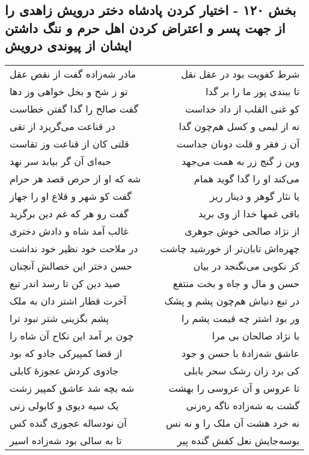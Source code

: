 \begin{center}
\section*{بخش ۱۲۰ - اختیار کردن پادشاه دختر درویش زاهدی را از جهت پسر و اعتراض کردن اهل حرم و ننگ داشتن ایشان از پیوندی درویش}
\label{sec:sh120}
\begin{longtable}{l p{0.5cm} r}
مادر شه‌زاده گفت از نقص عقل
&&
شرط کفویت بود در عقل نقل
\\
تو ز شح و بخل خواهی وز دها
&&
تا ببندی پور ما را بر گدا
\\
گفت صالح را گدا گفتن خطاست
&&
کو غنی القلب از داد خداست
\\
در قناعت می‌گریزد از تقی
&&
نه از لیمی و کسل هم‌چون گدا
\\
قلتی کان از قناعت وز تقاست
&&
آن ز فقر و قلت دونان جداست
\\
حبه‌ای آن گر بیابد سر نهد
&&
وین ز گنج زر به همت می‌جهد
\\
شه که او از حرص قصد هر حرام
&&
می‌کند او را گدا گوید همام
\\
گفت کو شهر و قلاع او را جهاز
&&
یا نثار گوهر و دینار ریز
\\
گفت رو هر که غم دین برگزید
&&
باقی غمها خدا از وی برید
\\
غالب آمد شاه و دادش دختری
&&
از نژاد صالحی خوش جوهری
\\
در ملاحت خود نظیر خود نداشت
&&
چهره‌اش تابان‌تر از خورشید چاشت
\\
حسن دختر این خصالش آنچنان
&&
کز نکویی می‌نگنجد در بیان
\\
صید دین کن تا رسد اندر تبع
&&
حسن و مال و جاه و بخت منتفع
\\
آخرت قطار اشتر دان به ملک
&&
در تبع دنیاش هم‌چون پشم و پشک
\\
پشم بگزینی شتر نبود ترا
&&
ور بود اشتر چه قیمت پشم را
\\
چون بر آمد این نکاح آن شاه را
&&
با نژاد صالحان بی مرا
\\
از قضا کمپیرکی جادو که بود
&&
عاشق شه‌زادهٔ با حسن و جود
\\
جادوی کردش عجوزهٔ کابلی
&&
کی برد زان رشک سحر بابلی
\\
شه بچه شد عاشق کمپیر زشت
&&
تا عروس و آن عروسی را بهشت
\\
یک سیه دیوی و کابولی زنی
&&
گشت به شه‌زاده ناگه ره‌زنی
\\
آن نودساله عجوزی گنده کس
&&
نه خرد هشت آن ملک را و نه نس
\\
تا به سالی بود شه‌زاده اسیر
&&
بوسه‌جایش نعل کفش گنده پیر

\end{longtable}
\end{center}
